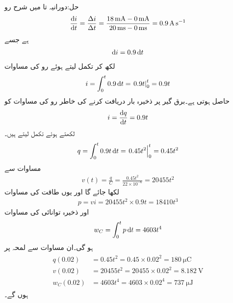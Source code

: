 حل:دورانیہ  تا  میں شرح رو
\begin{align*}
\frac{\dif i}{\dif t}=\frac{\Delta i}{\Delta t}=\frac{\SI{18}{\milli\ampere}-\SI{0}{\milli\ampere}}{\SI{20}{\milli\second}-\SI{0}{\milli\second}}=\SI{0.9}{\ampere\per\second}
\end{align*}
ہے جسے
\begin{align*}
\dif i =0.9 \dif t
\end{align*}
لکھ کر تکمل لیتے ہوئے رو کی مساوات
\begin{align*}
i=\int_{0}^{t} 0.9 \dif t=\left. 0.9  t\right|_{0}^{t}=0.9 t
\end{align*}
حاصل ہوتی ہے۔برق گیر پر ذخیرہ بار دریافت کرنے کی خاطر رو کی مساوات کو 
\begin{align*}
i=\frac{\dif q}{\dif t}=0.9 t
\end{align*}
لکھتے ہوئے تکمل لیتے ہیں۔
\begin{align*}
q=\int_{0}^{t}0.9 t \dif t=\left. 0.45 t^2 \right|_{0}^{t}=0.45 t^2
\end{align*}
مساوات  سے 
\begin{align*}
v(t)=\frac{q}{C}=\frac{0.45 t^2}{22\times 10^{-6}}=20455 t^2
\end{align*}
لکھا جائے گا اور یوں طاقت کی مساوات
\begin{align*}
p=vi =20455 t^2 \times 0.9 t=18410 t^3
\end{align*}
اور ذخیرہ توانائی کی مساوات
\begin{align*}
w_C=\int_0^t p \dif t=4603 t^4
\end{align*}
ہو گی۔ان مساوات سے لمحہ  پر 
\begin{gather}
\begin{aligned}\label{مساوات_امالہ_ابتدائی_قیمتیں_الف}
q(0.02)&=0.45 t^2=0.45\times 0.02^2=\SI{180}{\micro\coulomb}\\
v(0.02)&=20455 t^2=20455\times 0.02^2=\SI{8.182}{\volt}\\
w_C(0.02)&=4603 t^4=4603\times 0.02^4=\SI{737}{\micro\joule}
\end{aligned}
\end{gather}
ہوں گے۔

